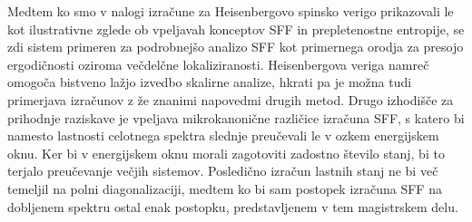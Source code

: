  Medtem ko smo v nalogi izračune za Heisenbergovo spinsko verigo prikazovali le kot ilustrativne zglede ob vpeljavah konceptov SFF in prepletenostne entropije, se zdi sistem primeren za podrobnejšo analizo SFF kot primernega orodja za presojo ergodičnosti oziroma večdelčne lokaliziranosti. Heisenbergova veriga namreč omogoča bistveno lažjo izvedbo skalirne analize, hkrati pa je možna tudi primerjava izračunov z že znanimi napovedmi drugih metod. Drugo izhodišče za prihodnje raziskave je vpeljava mikrokanonične različice izračuna SFF, s katero bi namesto lastnosti celotnega spektra slednje preučevali le v ozkem energijskem oknu. Ker bi v energijskem oknu morali zagotoviti zadostno število stanj, bi to terjalo preučevanje večjih sistemov. Posledično izračun lastnih stanj ne bi več temeljil na polni diagonalizaciji, medtem ko bi sam postopek izračuna SFF na dobljenem spektru ostal  enak postopku, predstavljenem v tem magistrskem delu. 
\cleardoublepage{}
{}




